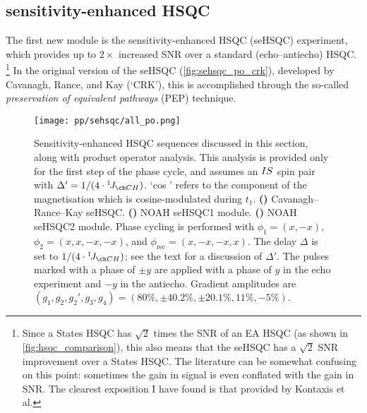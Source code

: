\subsection{\texorpdfstring{\carbon{}}{13C} sensitivity-enhanced HSQC}
\label{subsec:noah__sehsqc_c}

The first new module is the sensitivity-enhanced HSQC (seHSQC) experiment, which provides up to $2\times$ increased SNR over a standard (echo--antiecho) HSQC.%
\footnote{Since a States HSQC has $\sqrt{2}$ times the SNR of an EA HSQC (as shown in \cref{fig:hsqc_comparison}), this also means that the seHSQC has a $\sqrt{2}$ SNR improvement over a States HSQC. The literature can be somewhat confusing on this point: sometimes the gain in signal is even conflated with the gain in SNR. The clearest exposition I have found is that provided by Kontaxis et al.\autocite{Kontaxis1994JMRSA}}
In the original version of the seHSQC (\cref{fig:sehsqc_po_crk}), developed by Cavanagh, Rance, and Kay (`CRK')\autocite{Palmer1991JMR,Kay1992JACS}, this is accomplished through the so-called \textit{preservation of equivalent pathways} (PEP) technique\autocite{Cavanagh1993ARNMRS}.

\begin{figure}[!htbp]
    \centering
    \texttt{[image: pp/sehsqc/all\_po.png]}%
    {\label{fig:sehsqc_po_crk}}%
    {\label{fig:sehsqc_po_noah1}}%
    {\label{fig:sehsqc_po_noah2}}%
    \caption[CRK seHSQC and NOAH seHSQC modules]{
        Sensitivity-enhanced HSQC sequences discussed in this section, along with product operator analysis.
        This analysis is provided only for the first step of the phase cycle, and assumes an $IS\/$ spin pair with $\Delta' = 1 / (4 \cdot \oneJ{CH})$.
        `cos ' refers to the component of the  magnetisation which is cosine-modulated during $t_1$.
        \textbf{()} Cavanagh--Rance--Kay seHSQC.
        \textbf{()} NOAH seHSQC1 module.
        \textbf{()} NOAH seHSQC2 module.
        Phase cycling is performed with $\phi_1 = (x, -x)$, $\phi_2 = (x, x, -x, -x)$, and $\phi_\text{rec} = (x, -x, -x, x)$.
        The delay $\Delta$ is set to $1 / (4 \cdot \oneJ{CH})$; see the text for a discussion of $\Delta'$.
        The pulses marked with a phase of $\pm y$ are applied with a phase of $y$ in the echo experiment and $-y$ in the antiecho.
        Gradient amplitudes are $(g_1, g_2, g_2', g_3, g_4) = (80\%, \pm 40.2\%, \pm 20.1\%, 11\%, -5\%)$.
    }
    \label{fig:sehsqc_po}
\end{figure}

